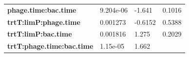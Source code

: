 \documentclass[]{article}
\begin{document}
\begin{longtable}[]{@{}llll@{}}
\begin{minipage}[t]{0.43\columnwidth}
\textbf{phage.time:bac.time}
\strut\end{minipage} &
\begin{minipage}[t]{0.17\columnwidth}\raggedright\strut
9.204e-06
\strut\end{minipage} &
\begin{minipage}[t]{0.13\columnwidth}\raggedright\strut
-1.641
\strut\end{minipage} &
\begin{minipage}[t]{0.16\columnwidth}\raggedright\strut
0.1016
\strut\end{minipage}\tabularnewline
\begin{minipage}[t]{0.43\columnwidth}\raggedright\strut
\textbf{trtT:limP:phage.time}
\strut\end{minipage} &
\begin{minipage}[t]{0.17\columnwidth}\raggedright\strut
0.001273
\strut\end{minipage} &
\begin{minipage}[t]{0.13\columnwidth}\raggedright\strut
-0.6152
\strut\end{minipage} &
\begin{minipage}[t]{0.16\columnwidth}\raggedright\strut
0.5388
\strut\end{minipage}\tabularnewline
\begin{minipage}[t]{0.43\columnwidth}\raggedright\strut
\textbf{trtT:limP:bac.time}
\strut\end{minipage} &
\begin{minipage}[t]{0.17\columnwidth}\raggedright\strut
0.001816
\strut\end{minipage} &
\begin{minipage}[t]{0.13\columnwidth}\raggedright\strut
1.275
\strut\end{minipage} &
\begin{minipage}[t]{0.16\columnwidth}\raggedright\strut
0.2029
\strut\end{minipage}\tabularnewline
\begin{minipage}[t]{0.43\columnwidth}\raggedright\strut
\textbf{trtT:phage.time:bac.time}
\strut\end{minipage} &
\begin{minipage}[t]{0.17\columnwidth}\raggedright\strut
1.15e-05
\strut\end{minipage} &
\begin{minipage}[t]{0.13\columnwidth}\raggedright\strut
1.662
\strut\end{minipage} &
\begin{minipage}[t]{0.16\columnwidth}\raggedright\strut

\end{minipage}
\end{longtable}
\end{document}
